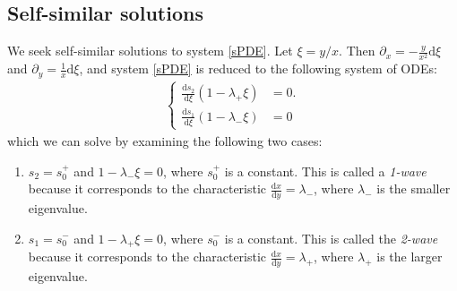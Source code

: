 \documentclass[12pt]{article}
\newcommand{\dd}[0]{\mathrm{d}}
\numberwithin{equation}{section}
\begin{document}
\subsection{Self-similar solutions}


 We seek self-similar
solutions to system \ref{sPDE}. Let $\xi = y/x$. Then
$\partial_x = -\frac{y}{x^2}\dd\xi$ and
$\partial_y = \frac{1}{x}\dd\xi$, and system \ref{sPDE} is reduced to
the following system of ODEs:
    \begin{align}
\left\{
\begin{array}{rl}
     \frac{\dd s_2}{\dd\xi}\left(1-\lambda_{+}\xi\right) &= 0. \\ 
     \frac{\dd s_1}{\dd\xi}\left(1-\lambda_{-}\xi\right) &= 0 
\end{array}\right.
    \label{sODE}
\end{align}
which we can solve by examining the following two cases:
\begin{enumerate}
    \item $s_2=s_0^+$ and $1-\lambda_- \xi = 0$, where $s_0^+$ is a constant. This is called a \textit{1-wave} because it corresponds to the characteristic $\frac{\dd x}{\dd y}=\lambda_-$, where $\lambda_-$ is the smaller eigenvalue.
     \item $s_1 = s_0^-$ and $1-\lambda_+\xi=0$, where $s_0^-$ is a constant. This is called the \textit{2-wave} because it corresponds to the characteristic $\frac{\dd x}{\dd y} = \lambda_+$, where $\lambda_+$ is the larger eigenvalue.
\end{enumerate}

\end{document}
